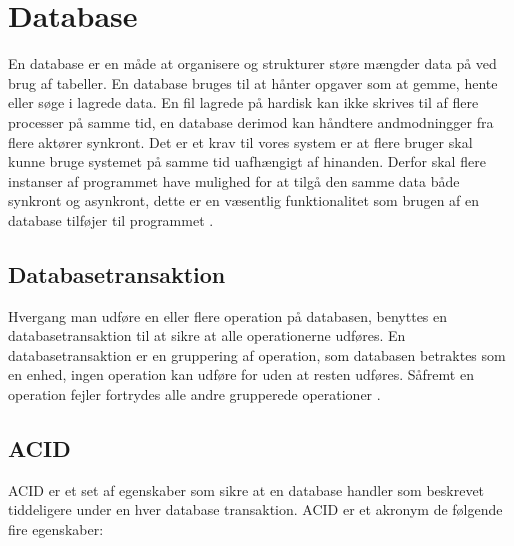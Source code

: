 \section{Database} 
\label{sec:database}

En database er en måde at organisere og strukturer støre mængder data på ved brug af tabeller. En database bruges til at hånter opgaver som at gemme, hente eller søge i lagrede data. En fil lagrede på hardisk kan ikke skrives til af flere processer på samme tid, en database derimod kan håndtere andmodningger fra flere aktører synkront. Det er et krav til vores system er at flere bruger skal kunne bruge systemet på samme tid uafhængigt af hinanden. Derfor skal flere instanser af programmet have mulighed for at tilgå den samme data både synkront og asynkront, dette er en væsentlig funktionalitet som brugen af en database tilføjer til programmet \cite{DatabaseMicosoftOffice}. 

\subsection{Databasetransaktion}
\label{sub:databasetransaktion}

Hvergang man udføre en eller flere operation på databasen, benyttes en databasetransaktion til at sikre at alle operationerne udføres. En databasetransaktion er en gruppering af operation, som databasen betraktes som en enhed, ingen operation kan udføre for uden at resten udføres. Såfremt en operation fejler fortrydes alle andre grupperede operationer \cite{databasetransaktion}.

\subsection{ACID}
\label{sub:acid}

ACID er et set af egenskaber som sikre at en database handler som beskrevet tiddeligere under en hver database transaktion. ACID er et akronym de følgende fire egenskaber: 

